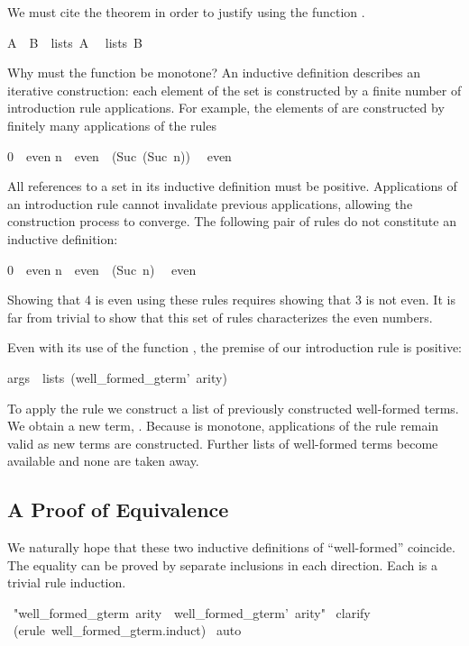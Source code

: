 We must cite the theorem  in order to justify 
using the function . 
\begin{isabelle}
A\ \isasymsubseteq\ B\ \isasymLongrightarrow \ lists\ A\ \isasymsubseteq
\ lists\ B
\end{isabelle}
%
Why must the function be monotone?  An inductive definition describes
an iterative construction: each element of the set is constructed by a
finite number of introduction rule applications.  For example, the
elements of  are constructed by finitely many applications of
the rules 
\begin{isabelle}
0\ \isasymin \ even\isanewline
n\ \isasymin \ even\ \isasymLongrightarrow \ (Suc\ (Suc\ n))\ \isasymin
\ even
\end{isabelle}
All references to a set in its
inductive definition must be positive.  Applications of an
introduction rule cannot invalidate previous applications, allowing the
construction process to converge.
The following pair of rules do not constitute an inductive definition:
\begin{isabelle}
0\ \isasymin \ even\isanewline
n\ \isasymnotin \ even\ \isasymLongrightarrow \ (Suc\ n)\ \isasymin
\ even
\end{isabelle}
%
Showing that 4 is even using these rules requires showing that 3 is not
even.  It is far from trivial to show that this set of rules
characterizes the even numbers.  

Even with its use of the function , the premise of our
introduction rule is positive:
\begin{isabelle}
args\ \isasymin \ lists\ (well_formed_gterm'\ arity)
\end{isabelle}
To apply the rule we construct a list  of previously
constructed well-formed terms.  We obtain a
new term, .  Because  is monotone,
applications of the rule remain valid as new terms are constructed.
Further lists of well-formed
terms become available and none are taken away.


\subsection{A Proof of Equivalence}

We naturally hope that these two inductive definitions of ``well-formed'' 
coincide.  The equality can be proved by separate inclusions in 
each direction.  Each is a trivial rule induction. 
\begin{isabelle}
\ "well_formed_gterm\ arity\ \isasymsubseteq \ well_formed_gterm'\ arity"\isanewline
{}\ clarify\isanewline
{}\ (erule\ well_formed_gterm.induct)\isanewline
{}\ auto\isanewline
{}
\end{isabelle}

